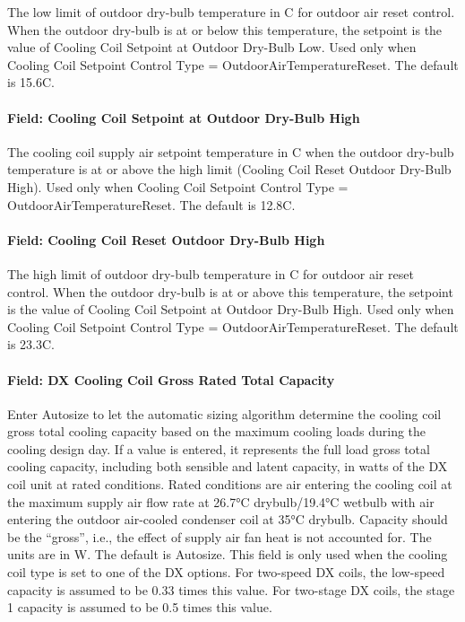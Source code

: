The low limit of outdoor dry-bulb temperature in C for outdoor air reset control. When the outdoor dry-bulb is at or below this temperature, the setpoint is the value of Cooling Coil Setpoint at Outdoor Dry-Bulb Low. Used only when Cooling Coil Setpoint Control Type = OutdoorAirTemperatureReset. The default is 15.6C.

\paragraph{Field: Cooling Coil Setpoint at Outdoor Dry-Bulb High}\label{field-cooling-coil-setpoint-at-outdoor-dry-bulb-high-2}

The cooling coil supply air setpoint temperature in C when the outdoor dry-bulb temperature is at or above the high limit (Cooling Coil Reset Outdoor Dry-Bulb High). Used only when Cooling Coil Setpoint Control Type = OutdoorAirTemperatureReset. The default is 12.8C.

\paragraph{Field: Cooling Coil Reset Outdoor Dry-Bulb High}\label{field-cooling-coil-reset-outdoor-dry-bulb-high-2}

The high limit of outdoor dry-bulb temperature in C for outdoor air reset control. When the outdoor dry-bulb is at or above this temperature, the setpoint is the value of Cooling Coil Setpoint at Outdoor Dry-Bulb High. Used only when Cooling Coil Setpoint Control Type = OutdoorAirTemperatureReset. The default is 23.3C.

\paragraph{Field: DX Cooling Coil Gross Rated Total Capacity}\label{field-dx-cooling-coil-gross-rated-total-capacity-1}

Enter Autosize to let the automatic sizing algorithm determine the cooling coil gross total cooling capacity based on the maximum cooling loads during the cooling design day. If a value is entered, it represents the full load gross total cooling capacity, including both sensible and latent capacity, in watts of the DX coil unit at rated conditions. Rated conditions are air entering the cooling coil at the maximum supply air flow rate at 26.7°C drybulb/19.4°C wetbulb with air entering the outdoor air-cooled condenser coil at 35°C drybulb. Capacity should be the ``gross'', i.e., the effect of supply air fan heat is not accounted for. The units are in W. The default is Autosize. This field is only used when the cooling coil type is set to one of the DX options. For two-speed DX coils, the low-speed capacity is assumed to be 0.33 times this value. For two-stage DX coils, the stage 1 capacity is assumed to be 0.5 times this value.

